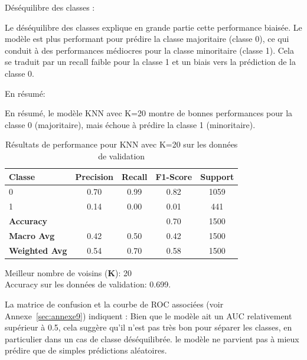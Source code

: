 \begin{flushleft}
\begin{enumerate}
Déséquilibre des classes :

Le déséquilibre des classes explique en grande partie cette performance biaisée. Le modèle est plus performant pour prédire la classe majoritaire (classe 0), ce qui conduit à des performances médiocres pour la classe minoritaire (classe 1). Cela se traduit par un recall faible pour la classe 1 et un biais vers la prédiction de la classe 0.

En résumé:

En résumé, le modèle KNN avec K=20 montre de bonnes performances pour la classe 0 (majoritaire), mais échoue à prédire la classe 1 (minoritaire).
\end{enumerate}
\end{flushleft}

\begin{table}[H]
\centering
\caption{Résultats de performance pour KNN avec K=20 sur les données de validation}
\label{tab:knn_k20_validation}
\begin{tabular}{|l|c|c|c|c|}
\hline
\textbf{Classe}       & \textbf{Precision} & \textbf{Recall} & \textbf{F1-Score} & \textbf{Support} \\ \hline
0                     & 0.70               & 0.99            & 0.82              & 1059             \\ \hline
1                     & 0.14               & 0.00            & 0.01              & 441              \\ \hline
\textbf{Accuracy} & \multicolumn{2}{|c|}{} & 0.70    & 1500     \\ \hline
\textbf{Macro Avg}    & 0.42               & 0.50            & 0.42              & 1500             \\ \hline
\textbf{Weighted Avg} & 0.54               & 0.70            & 0.58              & 1500             \\ \hline
\end{tabular}
\begin{flushleft}
Meilleur nombre de voisins (\textbf{K}): 20 \\
Accuracy sur les données de validation: 0.699.
\end{flushleft}
\end{table}


\begin{flushleft}
La matrice de confusion et la courbe de ROC associées (voir Annexe~\ref{sec:annexe9}) indiquent : Bien que le modèle ait un AUC relativement supérieur à 0.5, cela suggère qu'il n'est pas très bon pour séparer les classes, en particulier dans un cas de classe déséquilibrée. 
le modèle ne parvient pas à mieux prédire que de simples prédictions aléatoires.
\end{flushleft}

